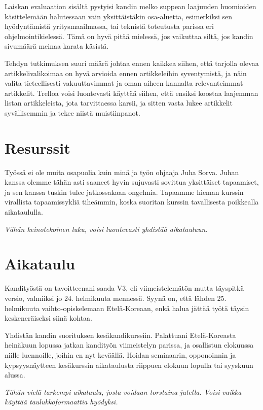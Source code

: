 \documentclass[12pt,a4paper,finnish,oneside]{article}
\begin{document}
Laiskan evaluaation sisältä pystyisi kandin melko suppean laajuuden huomioiden käsittelemään halutessaan vain yksittäistäkin osa-aluetta, esimerkiksi sen hyödyntämistä yritysmaailmassa, tai teknistä toteutusta parissa eri ohjelmointikielessä. Tämä on hyvä pitää mielessä, jos vaikuttaa siltä, jos kandin sivumäärä meinaa karata käsistä.

Tehdyn tutkimuksen suuri määrä johtaa ennen kaikkea siihen, että tarjolla olevaa artikkelivalikoimaa on hyvä arvioida ennen artikkeleihin syventymistä, ja näin valita tieteellisesti vakuuttavimmat ja oman aiheen kannalta relevanteimmat artikkelit. Trelloa voisi luontevasti käyttää siihen, että ensiksi koostaa laajemman listan artikkeleista, jota tarvittaessa karsii, ja sitten vasta lukee artikkelit syvällisemmin ja tekee niistä muistiinpanot.

\section{Resurssit}

Työssä ei ole muita osapuolia kuin minä ja työn ohjaaja Juha Sorva. Juhan kanssa olemme tähän asti saaneet hyvin sujuvasti sovittua yksittäiset tapaamiset, ja sen kanssa tuskin tulee jatkossakaan ongelmia. Tapaamme hieman kurssin virallista tapaamissykliä tiheämmin, koska suoritan kurssin tavallisesta poikkealla aikataululla.

\emph{Vähän keinotekoinen luku, voisi luontevasti yhdistää aikatauluun.}

\section{Aikataulu}

Kandityöstä on tavoitteenani saada V3, eli viimeistelemätön mutta täyspitkä versio, valmiiksi jo 24. helmikuuta mennessä. Syynä on, että lähden 25. helmikuuta vaihto-opiskelemaan Etelä-Koreaan, enkä halua jättää työtä täysin keskeneräiseksi siinä kohtaa.

Yhdistän kandin suorituksen kesäkandikurssiin. Palattuani Etelä-Koreasta heinäkuun lopussa jatkan kandityön viimeistelyn parissa, ja osallistun elokuussa niille luennoille, joihin en nyt keväällä. Hoidan seminaarin, opponoinnin ja kypsyysnäytteen kesäkurssin aikataulusta riippuen elokuun lopulla tai syyskuun alussa.

\emph{Tähän vielä tarkempi aikataulu, josta voidaan torstaina jutella. Voisi vaikka käyttää taulukkoformaattia hyödyksi.}
\end{document}
